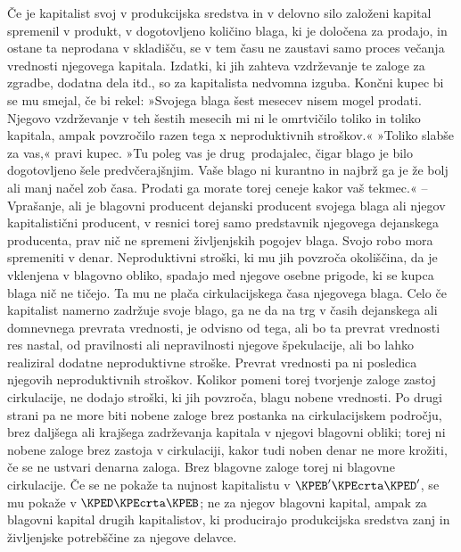 \documentclass[kapital_02.tex]{subfiles}
\begin{document}
Če je kapitalist svoj v produkcijska sredstva in v delovno silo založeni kapital spremenil v produkt, v dogotovljeno količino blaga, ki je določena za prodajo, in ostane ta neprodana v skladišču, se v tem času ne zaustavi samo proces večanja vrednosti njegovega kapitala.
Izdatki, ki jih zahteva vzdrževanje te zaloge za zgradbe, dodatna dela itd., so za kapitalista nedvomna izguba.
Končni kupec bi se mu smejal, če bi rekel: »Svojega blaga šest mesecev nisem mogel prodati.
Njegovo vzdrževanje v teh šestih mesecih mi ni le omrtvičilo toliko in toliko kapitala, ampak povzročilo razen tega x neproduktivnih stroškov.«
»Toliko slabše za vas,« pravi kupec.
»Tu poleg vas je drug\KPEstran\ prodajalec, čigar blago je bilo dogotovljeno šele predvčerajšnjim.
Vaše blago ni kurantno in najbrž ga je že bolj ali manj načel zob časa. 
Prodati ga morate torej ceneje kakor vaš tekmec.« -- 
Vprašanje, ali je blagovni producent dejanski producent svojega blaga ali njegov kapitalistični producent, v resnici torej samo predstavnik njegovega dejanskega producenta, prav nič ne spremeni življenjskih pogojev blaga. Svojo robo mora spremeniti v denar. 
Neproduktivni stroški, ki mu jih povzroča okoliščina, da je vklenjena v blagovno obliko, spadajo med njegove osebne prigode, ki se kupca blaga nič ne tičejo.
Ta mu ne plača cirkulacijskega časa njegovega blaga.
Celo če kapitalist namerno zadržuje svoje blago, ga ne da na trg v časih dejanskega ali domnevnega prevrata vrednosti, je odvisno od tega, ali bo ta prevrat vrednosti res nastal, od pravilnosti ali nepravilnosti njegove špekulacije, ali bo lahko realiziral dodatne neproduktivne stroške.
Prevrat vrednosti pa ni posledica njegovih neproduktivnih stroškov.
Kolikor pomeni torej tvorjenje zaloge zastoj cirkulacije, ne dodajo stroški, ki jih povzroča, blagu nobene vrednosti.
Po drugi strani pa ne more biti nobene zaloge brez postanka na
cirkulacijskem področju, brez daljšega ali krajšega zadrževanja kapitala v njegovi blagovni obliki; torej ni nobene zaloge brez zastoja v cirkulaciji, kakor tudi noben denar ne more krožiti, če se ne ustvari denarna zaloga.
Brez blagovne zaloge torej ni blagovne cirkulacije.
Če se ne pokaže ta nujnost kapitalistu v \(\KPEB'\KPEcrta\KPED'\), se mu pokaže v \(\KPED\KPEcrta\KPEB\); ne za njegov blagovni kapital, ampak za blagovni kapital drugih kapitalistov, ki producirajo produkcijska sredstva zanj in življenjske potrebščine za njegove delavce.
\end{document}
